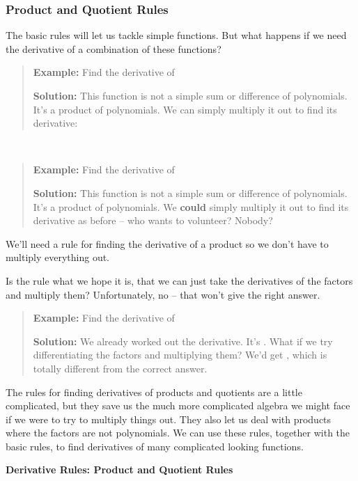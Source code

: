 \subsubsection{Product and Quotient
Rules}\label{product-and-quotient-rules}

The basic rules will let us tackle simple functions. But what happens if
we need the derivative of a combination of these functions?

\begin{quote}
\textbf{Example:} Find the derivative of

\textbf{Solution:} This function is not a simple sum or difference of
polynomials. It's a product of polynomials. We can simply multiply it
out to find its derivative:
\end{quote}

\textbf{\\
}

\begin{quote}
\textbf{Example:} Find the derivative of

\textbf{Solution:} This function is not a simple sum or difference of
polynomials. It's a product of polynomials. We \textbf{could} simply
multiply it out to find its derivative as before -- who wants to
volunteer? Nobody?
\end{quote}

We'll need a rule for finding the derivative of a product so we don't
have to multiply everything out.

Is the rule what we hope it is, that we can just take the derivatives of
the factors and multiply them? Unfortunately, no -- that won't give the
right answer.

\begin{quote}
\textbf{Example:} Find the derivative of

\textbf{Solution:} We already worked out the derivative. It's . What if
we try differentiating the factors and multiplying them? We'd get ,
which is totally different from the correct answer.
\end{quote}

The rules for finding derivatives of products and quotients are a little
complicated, but they save us the much more complicated algebra we might
face if we were to try to multiply things out. They also let us deal
with products where the factors are not polynomials. We can use these
rules, together with the basic rules, to find derivatives of many
complicated looking functions.

\textbf{Derivative Rules: Product and Quotient Rules}

